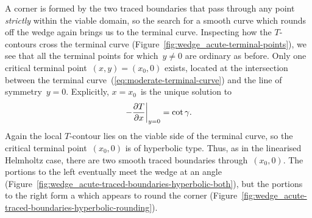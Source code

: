 \begin{figure}
\end{figure}

\begin{figure}
\end{figure}

A corner is formed by the two traced boundaries
that pass through any point \emph{strictly} within the viable domain,
so the search for a smooth curve which rounds off the wedge
again brings us to the terminal curve.
Inspecting how the $T$-contours cross the terminal curve
(Figure~\ref{fig:wedge_acute-terminal-points}),
we see that all the terminal points
for which~$y \ne 0$
are ordinary as before.
Only one critical terminal point~$(x, y) = (x_0, 0)$ exists,
located at the intersection
between the terminal curve~(\ref{eq:moderate-terminal-curve})
and the line of symmetry~$y = 0$.
Explicitly, $x = x_0$~is the unique solution to
\begin{equation}
  \eval*{-\pder{T}{x}}_{y=0} = \cot\gamma.
  \label{eq:moderate-critical-terminal-point}
\end{equation}
Again the local $T$-contour lies on the viable side of the terminal curve,
so the critical terminal point~$(x_0, 0)$ is of hyperbolic type.
Thus, as in the linearised Helmholtz case,
there are two smooth traced boundaries through~$(x_0, 0)$.
The portions to the left eventually meet the wedge at an angle
(Figure~\ref{fig:wedge_acute-traced-boundaries-hyperbolic-both}),
but the portions to the right form a 
which appears to round the corner
(Figure~\ref{fig:wedge_acute-traced-boundaries-hyperbolic-rounding}).

